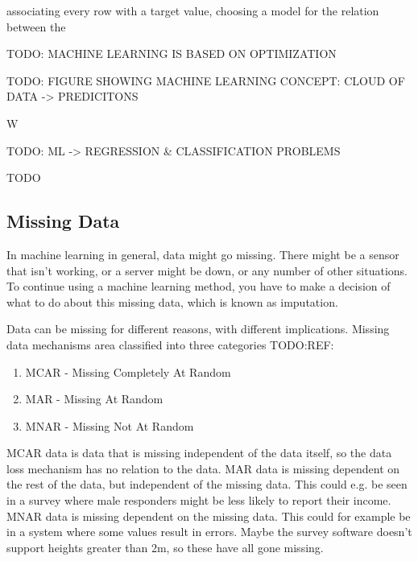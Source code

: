 \begin{equation}
  
\end{equation}

associating every row with a target value, choosing a model for the
relation between the 

TODO: MACHINE LEARNING IS BASED ON OPTIMIZATION

TODO: FIGURE SHOWING MACHINE LEARNING CONCEPT: CLOUD OF DATA -> PREDICITONS

W

TODO: ML -> REGRESSION & CLASSIFICATION PROBLEMS 

TODO 


\subsection{Missing Data}

In machine learning in general, data might go missing. There might be a sensor
that isn't working, or a server might be down, or any number of other
situations. To continue using a machine learning method, you have to make a
decision of what to do about this missing data, which is known as imputation.

Data can be missing for different reasons, with different implications. Missing
data mechanisms area classified into three categories TODO:REF:

\begin{enumerate}
  \item MCAR - Missing Completely At Random
  \item MAR  - Missing At Random
  \item MNAR - Missing Not At Random
\end{enumerate}

MCAR data is data that is missing independent of the data itself, so the data
loss mechanism has no relation to the data. MAR data is missing dependent on
the rest of the data, but independent of the missing data. This could e.g. be
seen in a survey where male responders might be less likely to report their
income. MNAR data is missing dependent on the missing data. This could for
example be in a system where some values result in errors. Maybe the survey
software doesn't support heights greater than 2m, so these have all gone
missing.

